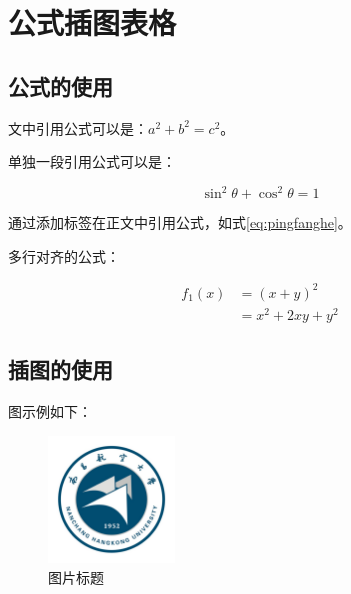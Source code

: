 %
%
%


\chapter{公式插图表格}

\section{公式的使用}

文中引用公式可以是：$a^2+b^2=c^2$。

单独一段引用公式可以是：

\begin{equation}
    \sin^2{\theta}+\cos^2{\theta}=1 \label{eq:pingfanghe}
\end{equation}

通过添加标签在正文中引用公式，如式\eqref{eq:pingfanghe}。

多行对齐的公式：

\begin{equation}
  \begin{aligned}
    f_1(x)&=(x+y)^2\\
          &=x^2+2xy+y^2
  \end{aligned}
\end{equation}

\section{插图的使用}

图示例如下：

\begin{figure}[htbp]
	\begin{center}
	    \vspace{13pt} %
		\includegraphics[width = 0.3\textwidth]{images/nchu_logo.png}
		\caption{图片标题} 
		\label{图片标题序号} %
	\end{center}
\end{figure}

